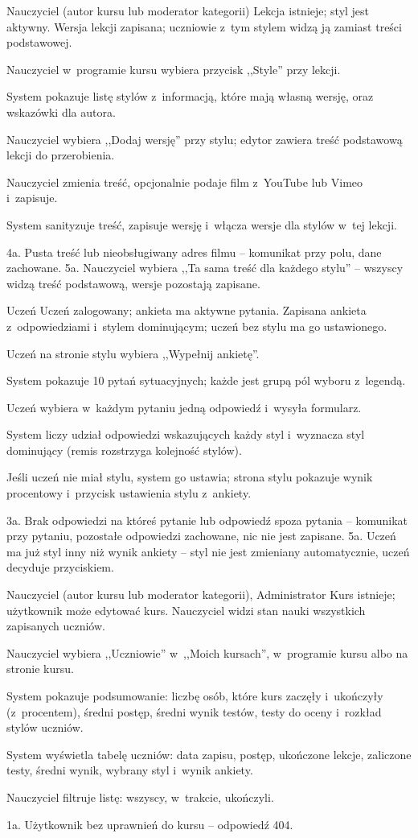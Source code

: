 {Nauczyciel (autor kursu lub moderator kategorii)}
{Lekcja istnieje; styl jest aktywny.}
{Wersja lekcji zapisana; uczniowie z~tym stylem widzą ją zamiast treści podstawowej.}
{\item Nauczyciel w~programie kursu wybiera przycisk ,,Style'' przy lekcji.
 \item System pokazuje listę stylów z~informacją, które mają własną wersję, oraz wskazówki dla autora.
 \item Nauczyciel wybiera ,,Dodaj wersję'' przy stylu; edytor zawiera treść podstawową lekcji do przerobienia.
 \item Nauczyciel zmienia treść, opcjonalnie podaje film z~YouTube lub Vimeo i~zapisuje.
 \item System sanityzuje treść, zapisuje wersję i~włącza wersje dla stylów w~tej lekcji.}
{4a. Pusta treść lub nieobsługiwany adres filmu -- komunikat przy polu, dane zachowane.\newline
5a. Nauczyciel wybiera ,,Ta sama treść dla każdego stylu'' -- wszyscy widzą treść podstawową, wersje pozostają zapisane.}

{Uczeń}
{Uczeń zalogowany; ankieta ma aktywne pytania.}
{Zapisana ankieta z~odpowiedziami i~stylem dominującym; uczeń bez stylu ma go ustawionego.}
{\item Uczeń na stronie stylu wybiera ,,Wypełnij ankietę''.
 \item System pokazuje 10 pytań sytuacyjnych; każde jest grupą pól wyboru z~legendą.
 \item Uczeń wybiera w~każdym pytaniu jedną odpowiedź i~wysyła formularz.
 \item System liczy udział odpowiedzi wskazujących każdy styl i~wyznacza styl dominujący (remis rozstrzyga kolejność stylów).
 \item Jeśli uczeń nie miał stylu, system go ustawia; strona stylu pokazuje wynik procentowy i~przycisk ustawienia stylu z~ankiety.}
{3a. Brak odpowiedzi na któreś pytanie lub odpowiedź spoza pytania -- komunikat przy pytaniu, pozostałe odpowiedzi zachowane, nic nie jest zapisane.\newline
5a. Uczeń ma już styl inny niż wynik ankiety -- styl nie jest zmieniany automatycznie, uczeń decyduje przyciskiem.}

{Nauczyciel (autor kursu lub moderator kategorii), Administrator}
{Kurs istnieje; użytkownik może edytować kurs.}
{Nauczyciel widzi stan nauki wszystkich zapisanych uczniów.}
{\item Nauczyciel wybiera ,,Uczniowie'' w~,,Moich kursach'', w~programie kursu albo na stronie kursu.
 \item System pokazuje podsumowanie: liczbę osób, które kurs zaczęły i~ukończyły (z~procentem), średni postęp, średni wynik testów, testy do oceny i~rozkład stylów uczniów.
 \item System wyświetla tabelę uczniów: data zapisu, postęp, ukończone lekcje, zaliczone testy, średni wynik, wybrany styl i~wynik ankiety.
 \item Nauczyciel filtruje listę: wszyscy, w~trakcie, ukończyli.}
{1a. Użytkownik bez uprawnień do kursu -- odpowiedź 404.}

